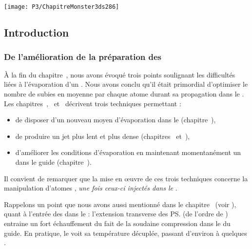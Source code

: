 \chapter{\TitreChapitreCinq}\label{chap:PiegeDipolaire}

\bfig
\texttt{[image: P3/ChapitreMonster3ds286]}
\SansCaption
\efig

\pagebreak

\minitoc
\vspace{0.5cm}


\section{Introduction}

\subsection{De l'amélioration de la préparation des \nats}\label{sec:MotivationPD}

\`A la fin du chapitre~, nous avons évoqué trois points soulignant les difficultés liées à l'évaporation d'un \jat. Nous avons conclu qu'il était primordial d'optimiser le nombre de \colels subies en moyenne par chaque atome durant sa propagation dans le \gm. Les chapitres~,~ et~ décrivent trois techniques permettant :
\begin{itemize}
	\item de disposer d'un nouveau moyen d'évaporation dans le \gm (chapitre~),
	\item de produire un jet plus lent et plus dense (chapitres~ et~),
	\item d'améliorer les conditions d'évaporation en maintenant momentanément un \pp \td dans le guide (chapitre~).
\end{itemize}

\casse

\noindent
Il convient de remarquer que la mise en \oe uvre de ces trois techniques concerne la manipulation d'atomes \ufs, \emph{une fois ceux-ci injectés dans le \gm}.

Rappelons un point que nous avons aussi mentionné dans le chapitre~ (voir ), quant à l'entrée des \pats dans le \gm : l'extension transverse des \ps (de l'ordre de ) entraine un fort échauffement du fait de la soudaine compression dans le \ppt du guide. En pratique, le \p voit sa température décuplée, passant d'environ  à quelques .%

